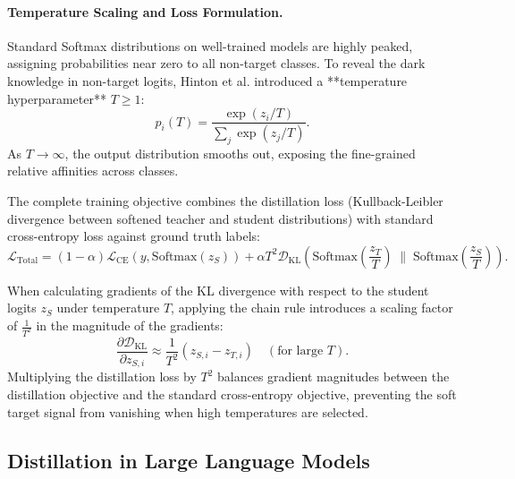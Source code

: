\documentclass[../../../main.tex]{subfiles}
\begin{document}
\paragraph{Temperature Scaling and Loss Formulation.}
Standard Softmax distributions on well-trained models are highly peaked, assigning probabilities near zero to all non-target classes. To reveal the dark knowledge in non-target logits, Hinton et al. introduced a **temperature hyperparameter** $T \ge 1$:
\begin{equation}
\label{eq:softmax_temperature}
p_i(T) = \frac{\exp(z_i / T)}{\sum_j \exp(z_j / T)}.
\end{equation}
As $T \to \infty$, the output distribution smooths out, exposing the fine-grained relative affinities across classes.

The complete training objective combines the distillation loss (Kullback-Leibler divergence between softened teacher and student distributions) with standard cross-entropy loss against ground truth labels:
\begin{equation}
\label{eq:kd_complete_loss}
\mathcal{L}_{\text{Total}} = (1 - \alpha) \mathcal{L}_{\text{CE}}(y, \text{Softmax}(z_S)) + \alpha T^2 \mathcal{D}_{\text{KL}}\left(\text{Softmax}\left(\frac{z_T}{T}\right) \;\Big\|\; \text{Softmax}\left(\frac{z_S}{T}\right)\right).
\end{equation}

\begin{intuition}
When calculating gradients of the KL divergence with respect to the student logits $z_S$ under temperature $T$, applying the chain rule introduces a scaling factor of $\frac{1}{T^2}$ in the magnitude of the gradients:
\begin{equation}
\frac{\partial \mathcal{D}_{\text{KL}}}{\partial z_{S,i}} \approx \frac{1}{T^2} (z_{S,i} - z_{T,i}) \quad (\text{for large } T).
\end{equation}
Multiplying the distillation loss by $T^2$ balances gradient magnitudes between the distillation objective and the standard cross-entropy objective, preventing the soft target signal from vanishing when high temperatures are selected.
\end{intuition}

\subsection{Distillation in Large Language Models}
\label{subsec:distillation_in_llms}
\end{document}
